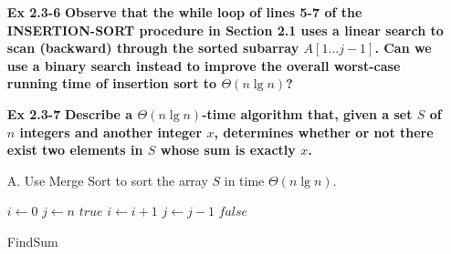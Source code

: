 \documentclass[fontsize=12pt,paper=a4,open=any]{book}
\begin{document}
\begin{enumerate}
	\item[\textbf{Ex 2.3-6}]
		\textbf{Observe that the while loop of lines 5-7 of the INSERTION-SORT procedure in Section 2.1 uses a linear search to scan (backward) through the sorted subarray $A[1 \dots j-1]$. Can we use a binary search instead to improve the overall worst-case running time of insertion sort to $\Theta(n \lg n)$?}
			
	\item[\textbf{Ex 2.3-7}]
		\textbf{Describe a $\Theta(n \lg n)$-time algorithm that, given a set $S$ of $n$ integers and another integer $x$, determines whether or not there exist two elements in $S$ whose sum is exactly $x$.}
			
	\item[A.]
		Use Merge Sort to sort the array $S$ in time $\Theta(n \lg n)$.\\
		\begin{algorithm}[H]
			
			\DontPrintSemicolon			
			
			$i \longleftarrow 0$\;
			$j \longleftarrow n$\;
			{
				{
					\Return $true$\;
				}
				{
					$i \longleftarrow i+1$\;
				}
				{
					$j \longleftarrow j-1$\;
				}
			}
			\Return $false$\;			
						
			\caption{FindSum}
		\end{algorithm}
	
\end{enumerate}
\end{document}
